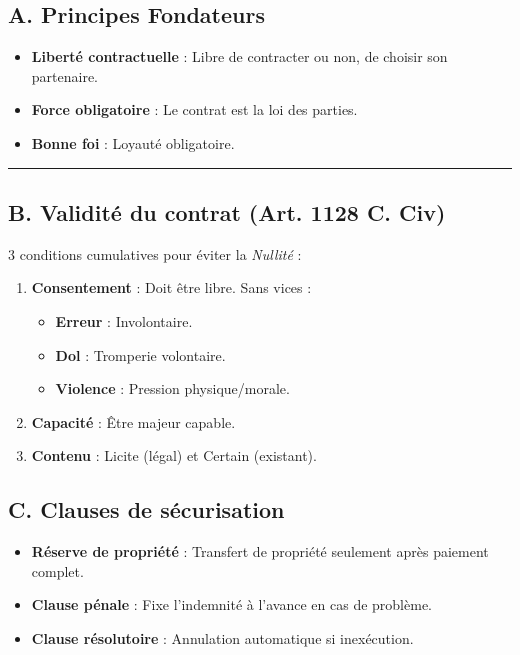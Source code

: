 \documentclass[a4paper,10pt]{article}
\newcommand{\notion}[1]{\textbf{\textcolor{mainBlue}{#1}}}
\newcommand{\important}[1]{\textit{\textcolor{alertRed}{#1}}}
\newcommand{\definition}[1]{\textbf{\textcolor{softTeal}{#1}}}
\begin{document}
\begin{tcolorbox}[title=2. DROIT : Le Contrat, colframe=softTeal]
    
    \subsection*{A. Principes Fondateurs}
    \begin{itemize}[leftmargin=*]
        \item \notion{Liberté contractuelle} : Libre de contracter ou non, de choisir son partenaire.
        \item \notion{Force obligatoire} : Le contrat est la loi des parties.
        \item \notion{Bonne foi} : Loyauté obligatoire.
    \end{itemize}

    \vspace{0.2cm}
    \hrule
    \vspace{0.2cm}

    \subsection*{B. Validité du contrat (Art. 1128 C. Civ)}
    3 conditions cumulatives pour éviter la \important{Nullité} :
    \begin{enumerate}[leftmargin=*]
        \item \definition{Consentement} : Doit être libre. Sans vices :
        \begin{itemize}
            \item \textbf{Erreur} : Involontaire.
            \item \textbf{Dol} : Tromperie volontaire.
            \item \textbf{Violence} : Pression physique/morale.
        \end{itemize}
        \item \definition{Capacité} : Être majeur capable.
        \item \definition{Contenu} : Licite (légal) et Certain (existant).
    \end{enumerate}

    \subsection*{C. Clauses de sécurisation}
    \begin{itemize}
        \item \notion{Réserve de propriété} : Transfert de propriété seulement après paiement complet.
        \item \notion{Clause pénale} : Fixe l'indemnité à l'avance en cas de problème.
        \item \notion{Clause résolutoire} : Annulation automatique si inexécution.
    \end{itemize}
\end{tcolorbox}
\end{document}

